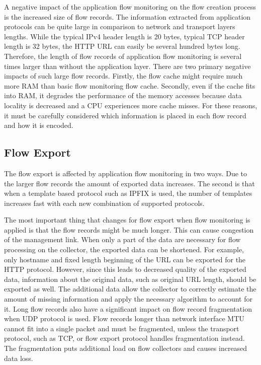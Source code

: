 A negative impact of the application flow monitoring on the flow creation process is the increased size of flow records. The information extracted from application protocols can be quite large in comparison to network and transport layers lengths. While the typical IPv4 header length is 20 bytes, typical TCP header length is 32 bytes, the HTTP URL can easily be several hundred bytes long. Therefore, the length of flow records of application flow monitoring is several times larger than without the application layer. There are two primary negative impacts of such large flow records. Firstly, the flow cache might require much more RAM than basic flow monitoring flow cache. Secondly, even if the cache fits into RAM, it degrades the performance of the memory accesses because data locality is decreased and a CPU experiences more cache misses. For these reasons, it must be carefully considered which information is placed in each flow record and how it is encoded.

\subsection{Flow Export}

The flow export is affected by application flow monitoring in two ways. Due to the larger flow records the amount of exported data increases. The second is that when a template based protocol such as IPFIX is used, the number of templates increases fast with each new combination of supported protocols.

The most important thing that changes for flow export when flow monitoring is applied is that the flow records might be much longer. This can cause congestion of the management link. When only a part of the data are necessary for flow processing on the collector, the exported data can be shortened. For example, only hostname and fixed length beginning of the URL can be exported for the HTTP protocol. However, since this leads to decreased quality of the exported data, information about the original data, such as original URL length, should be exported as well. The additional data allow the collector to correctly estimate the amount of missing information and apply the necessary algorithm to account for it. Long flow records also have a significant impact on flow record fragmentation when UDP protocol is used. Flow records longer than network interface MTU cannot fit into a single packet and must be fragmented, unless the transport protocol, such as TCP,  or flow export protocol handles fragmentation instead. The fragmentation puts additional load on flow collectors and causes increased data loss.

